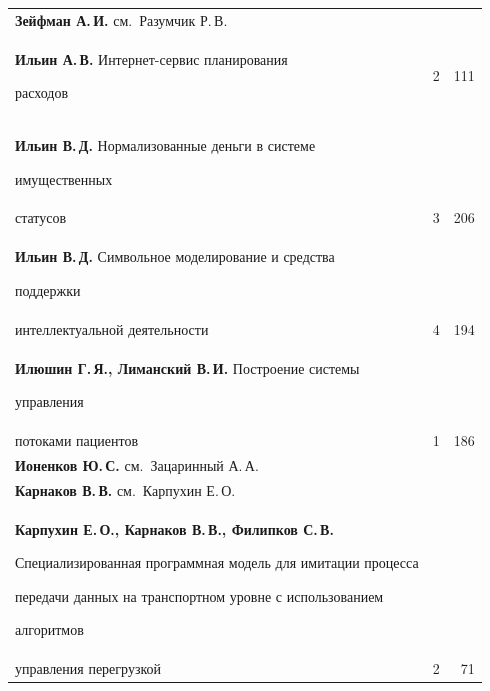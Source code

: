 {\begin{tabular}{p{317.5pt}rr}
\textbf{Зейфман А.\,И.} см.\ Разумчик Р.\,В.&&\\[.5pt]


\textbf{Ильин А.\,В.} Интернет-сервис планирования


расходов&2&111\\[.5pt]


\textbf{Ильин В.\,Д.} Нормализованные деньги в системе


имущественных\linebreak


\\[-12pt]


\hspace*{21pt}статусов&3&206\\[.5pt]


\textbf{Ильин В.\,Д.} Символьное моделирование и средства


поддержки\linebreak


\\[-12pt]


\hspace*{21pt}интеллектуальной деятельности&4&194\\[.5pt]


\textbf{Илюшин Г.\,Я., Лиманский В.\,И.} Построение системы


управления\linebreak


\\[-12pt]


\hspace*{21pt}потоками пациентов&1&186\\[.5pt]


\textbf{Ионенков Ю.\,С.} см.\ Зацаринный А.\,А.&&\\[.5pt]


\textbf{Карнаков В.\,В.} см.\ Карпухин Е.\,О.&&\\[.5pt]


\hangindent=21pt\noindent\textbf{Карпухин Е.\,О., Карнаков В.\,В., Филипков С.\,В.}


Специализированная программная модель для имитации процесса


передачи данных на транспортном уровне с использованием


алгоритмов\linebreak


\\[-12pt]


\hspace*{21pt}управления перегрузкой&2&71\\[.5pt]



\end{tabular}}
